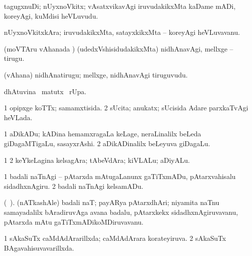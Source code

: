 {\bentry
{} 
\gl{\nA}
\expl{}
\bmng
 tagugxnuDi; nUyxnoVkitx; vAsatxvikavAgi iruvudakikxMta kaDame mADi, koreyAgi, kuMdisi heVLuvudu. 
\emng
\eentry

\bentry
{} 
\gl{\nA}
\expl{}
\bmng
 nUyxnoVkitxkAra; iruvudakikxMta, satayxkikxMta -- koreyAgi heVLuvavanu. 
\emng
\eentry

\bentry
{} 
\gl{\akirx}
\expl{}
\bmng
 (moVTAru vAhanada \vi) (udedxVshisidudakikxMta) nidhAnavAgi, mellxge -- tirugu. 
\emng
\eentry

\bentry
{} 
\gl{\nA}
\expl{}
\bmng
 (vAhana) nidhAnatirugu; mellxge, nidhAnavAgi tiruguvudu. 
\emng
\eentry

\bentry
{} 
\gl{\kirx}
\expl{}
\bmng
  dhAtuvina \BU\ matutx \BUkaq\ rUpa. 
\emng
\eentry

\bentry
{} 
\gl{\gu}
\expl{}
\bmng
\bnum
\num{1} opipxge koTTx; samamxtisida. 
\num{2} sUcita; anukatx; sUcisida Adare parxkaTvAgi heVLada. 
\enum
\emng
\eentry

\bentry
{} 
\gl{\nA}
\bmng
\bnum
\num{1} aDikADu; kADina hemamxragaLa keLage, neraLinalilx beLeda giDagaMTigaLu, sasayxrAshi. 
\num{2} aDikADinalilx beLeyuva giDagaLu. 
\enum
\emng
\eentry

\bentry
{} 
\gl{\nA}
\expl{}
\bmng
\bnum
\num{1}  
\num{2} keYkeLagina kelsagAra; tAbeVdAra; kiVLALu; aDiyALu. 
\enum
\emng
\eentry

\bentry
{} 
\gl{\sakirx}
\bmng
\bnum
\num{1} badali naTnAgi -- pAtarxda mAtugaLanunx gaTiTxmADu, pAtarxvahisalu sidadhxnAgiru. 
\num{2} badali naTnAgi kelsamADu. 
\enum
\emng
\eentry

\bentry
{} 
\gl{\nA}
\expl{}
\bmng
 (\bava\ ). (nATkashAle) badali naT; payARya pAtarxdhAri; niyamita naTnu samayadalilx bAradiruvAga avana badalu, pAtarxkekx sidadhxnAgiruvavanu, pAtarxda mAtu gaTiTxmADikoMDiruvavanu. 
\emng
\eentry

\bentry
{} 
\gl{\gu}
\expl{}
\bmng
\bnum
\num{1} sAkaSuTx caMdAdArarillxda; caMdAdArara korateyiruva. 
\num{2} sAkaSuTx BAgavahisuvavarillxda. 
\enum
\emng
\eentry

}
